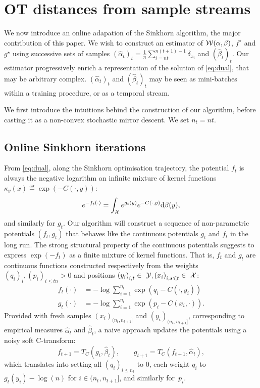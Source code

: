 
\section{OT distances from sample streams}

We now introduce an online adapation of the Sinkhorn algorithm, the major
contribution of this paper. We wish to construct an estimator of
$\mathcal{W}(\alpha,\beta)$, $f^\star$ and $g^\star$ using successive sets of samples
$(\hat \alpha_t)_t = \frac{1}{n} \sum_{i=nt}^{n(t+1) - 1} \delta_{x_i}$ and
${(\hat \beta_t)}_t$. Our estimator progressively enrich a representation of the
solution of \eqref{eq:dual}, that may be arbitrary complex. $(\hat \alpha_t)_t$
and $(\hat \beta_t)_t$ may be seen as mini-batches within a training procedure,
or as a temporal stream. 

We first introduce the intuitions behind the construction of our algorithm,
before casting it as a non-convex stochastic mirror descent. We set $n_t = nt$.

\subsection{Online Sinkhorn iterations}

From \eqref{eq:dual}, along the Sinkhorn optimisation trajectory, the potential $f_t$ is always the negative logarithm an
infinite mixture of kernel functions $\kappa_y(x) \eqdef \exp(-C(\cdot, y))$:
\begin{equation*}
    e^{-f_t(\cdot)} = 
    \int_{\mathcal{X}} e^{g_t(y)}  e^{-C(\cdot, y)} \textrm{d} \beta(y),
\end{equation*}
and similarly for $g_t$. Our algorithm will construct a sequence of
non-parametric potentials $(f_t, g_t)$ that behaves like the continuous
potentials $g_t$ and $f_t$ in the long run. The strong structural property of
the continuous potentials suggests to express
$\exp(-f_t)$ as a finite mixture of kernel functions.
That is, $f_t$ and $g_t$ are continuous functions constructed
respectively from the weights ${(q_i)}_{i}, {(p_i)}_{i \leq tn} > 0$ and
positions ${(y_i)}_{i,t} \in~\mathcal{Y}, {(x_i)}_{i,s\leqslant t} \in~\mathcal{X}$:
\begin{align}\label{eq:param}
    f_t(\cdot) &= - \log \sum_{i=1}^{n_t} 
    \exp(q_i - C(\cdot, y_i)) \\
    g_t(\cdot) &= - \log \sum_{i=1}^{n_t}
    \exp(p_i - C(x_i, \cdot)).
\end{align}
Provided with fresh samples $(x_i)_{(n_t, n_{t+1}]}$ and $(y_i)_{(n_t, n_{t+1}]}$, 
corresponding to empirical measures $\hat \alpha_t$ and $\hat \beta_t$, a naive approach
 updates the potentials using a noisy soft C-transform:
\begin{equation}\label{eq:updates}
     f_{t+1} = T_{C}(g_t, \hat \beta_t),
    \qquad g_{t+1} = T_{C}(f_{t+1}, \hat \alpha_t),
\end{equation}
which translates into setting all $(q_i)_{i \leq n_t}$ to $0$, each weight
 $q_i$ to $g_t(y_i) - \log(n)$ for $i \in (n_t, n_{t+1}]$, and similarly for~$p_i$.


